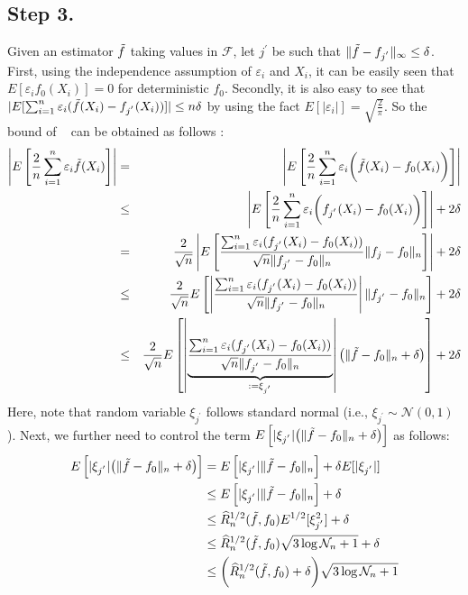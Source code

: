 \documentclass{article}
\theoremstyle{definition}
\begin{document}
\subsection{Step 3.}
Given an estimator $\Tilde{f}$ taking values in $\mathcal{F}$, let $j^{'}$ be such that $\|\Tilde{f}-f_{j^{'}}\|_{\infty} \leq\delta$.
First, using the independence assumption of $\varepsilon_{i}$ and $X_{i}$, it can be easily seen that $E[\varepsilon_{i}f_{0}(X_{i})]=0$ for deterministic $f_{0}$. Secondly, it is also easy to see that $|E[\sum_{i=1}^{n}\varepsilon_{i}(\Tilde{f}(X_{i})-f_{j^{'}}(X_{i}))]|\leq n\delta$ by using the fact $E[|\varepsilon_{i}|]=\sqrt{\frac{2}{\pi}}$. So the bound of ~ can be obtained as follows :
\begin{eqnarray*}
    \left| E\left[ \frac{2}{n}\sum_{i=1}^{n} \varepsilon_{i}\Tilde{f}(X_{i}) \right] \right|
    &=& \left| E\left[ \frac{2}{n}\sum_{i=1}^{n} \varepsilon_{i} \bigg( \Tilde{f}(X_{i}) - f_{0}(X_{i}) \bigg) \right] \right| \\ 
    &\leq& \left| E\left[ \frac{2}{n}\sum_{i=1}^{n} \varepsilon_{i} \bigg( f_{j^{'}}(X_{i}) - f_{0}(X_{i}) \bigg) \right] \right| + 2\delta \\
    &=& \frac{2}{\sqrt{n}}\left| E\left[ \frac{\sum_{i=1}^{n}\varepsilon_{i}(f_{j^{'}}(X_{i})-f_{0}(X_{i}))}{\sqrt{n}\|f_{j^{'}}-f_{0}\|_{n}} \|f_{j}-f_{0}\|_{n} \right] \right| + 2\delta \\
    &\leq& \frac{2}{\sqrt{n}} E\left[ \left|\frac{\sum_{i=1}^{n}\varepsilon_{i}(f_{j^{'}}(X_{i})-f_{0}(X_{i}))}{\sqrt{n}\|f_{j^{'}}-f_{0}\|_{n}} \right|\|f_{j^{'}}-f_{0}\|_{n} \right] + 2\delta \\
    &\leq& \frac{2}{\sqrt{n}} E\left[ \left|\underbrace{\frac{\sum_{i=1}^{n}\varepsilon_{i}(f_{j^{'}}(X_{i})-f_{0}(X_{i}))}{\sqrt{n}\|f_{j^{'}}-f_{0}\|_{n}}}_{:=\xi_{j^{'}}} \right| \big( \|\Tilde{f}-f_{0}\|_{n} + \delta \big) \right] + 2\delta
\end{eqnarray*}
Here, note that random variable $\xi_{j^{'}}$ follows standard normal (i.e., $\xi_{j^{'}}\sim\mathcal{N}(0,1)$).
Next, we further need to control the term $E\left[|\xi_{j^{'}}|\big(\|\Tilde{f}-f_{0}\|_{n} + \delta\big)\right]$ as follows:
\begin{align*}
    E\left[|\xi_{j^{'}}|\big(\|\Tilde{f}-f_{0}\|_{n} + \delta\big)\right] 
    &= E\left[|\xi_{j^{'}}|\|\Tilde{f}-f_{0}\|_{n}\right] + \delta E[|\xi_{j^{'}}|]\\
    &\leq E\left[|\xi_{j^{'}}|\|\Tilde{f}-f_{0}\|_{n}\right] + \delta \\
    &\leq \widehat{R}_{n}^{1/2}(\Tilde{f},f_{0})E^{1/2}[\xi_{j^{'}}^{2}] + \delta \\
    &\leq \widehat{R}_{n}^{1/2}(\Tilde{f},f_{0})\sqrt{3\log\mathcal{N}_{n}+1} + \delta \\
    &\leq \bigg(\widehat{R}_{n}^{1/2}(\Tilde{f},f_{0})+\delta\bigg)\sqrt{3\log\mathcal{N}_{n}+1}
\end{align*}
\end{document}
